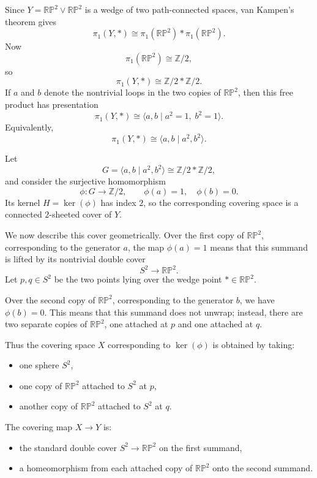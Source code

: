 \begin{solution}
Since \(Y=\mathbb{RP}^2\vee \mathbb{RP}^2\) is a wedge of two path-connected spaces, van Kampen's theorem gives
\[
\pi_1(Y,*)\cong \pi_1(\mathbb{RP}^2)*\pi_1(\mathbb{RP}^2).
\]
Now
\[
\pi_1(\mathbb{RP}^2)\cong \mathbb Z/2,
\]
so
\[
\pi_1(Y,*)\cong \mathbb Z/2 * \mathbb Z/2.
\]
If \(a\) and \(b\) denote the nontrivial loops in the two copies of \(\mathbb{RP}^2\), then this free product has presentation
\[
\pi_1(Y,*)\cong \langle a,b \mid a^2=1,\; b^2=1\rangle.
\]
Equivalently,
\[
\pi_1(Y,*)\cong \langle a,b \mid a^2,b^2\rangle.
\]

\par


Let
\[
G=\langle a,b \mid a^2,b^2\rangle \cong \mathbb Z/2 * \mathbb Z/2,
\]
and consider the surjective homomorphism
\[
\phi:G\to \mathbb Z/2,\qquad \phi(a)=1,\quad \phi(b)=0.
\]
Its kernel \(H=\ker(\phi)\) has index \(2\), so the corresponding covering space is a connected \(2\)-sheeted cover of \(Y\).

We now describe this cover geometrically. Over the first copy of \(\mathbb{RP}^2\), corresponding to the generator \(a\), the map \(\phi(a)=1\) means that this summand is lifted by its nontrivial double cover
\[
S^2 \longrightarrow \mathbb{RP}^2.
\]
Let \(p,q\in S^2\) be the two points lying over the wedge point \(*\in \mathbb{RP}^2\).

Over the second copy of \(\mathbb{RP}^2\), corresponding to the generator \(b\), we have \(\phi(b)=0\). This means that this summand does not unwrap; instead, there are two separate copies of \(\mathbb{RP}^2\), one attached at \(p\) and one attached at \(q\).

Thus the covering space \(X\) corresponding to \(\ker(\phi)\) is obtained by taking:
\begin{itemize}
	\item one sphere \(S^2\),
	\item one copy of \(\mathbb{RP}^2\) attached to \(S^2\) at \(p\),
	\item another copy of \(\mathbb{RP}^2\) attached to \(S^2\) at \(q\).
\end{itemize}

The covering map \(X\to Y\) is:
\begin{itemize}
	\item the standard double cover \(S^2\to \mathbb{RP}^2\) on the first summand,
	\item a homeomorphism from each attached copy of \(\mathbb{RP}^2\) onto the second summand.
\end{itemize}


\end{solution}
